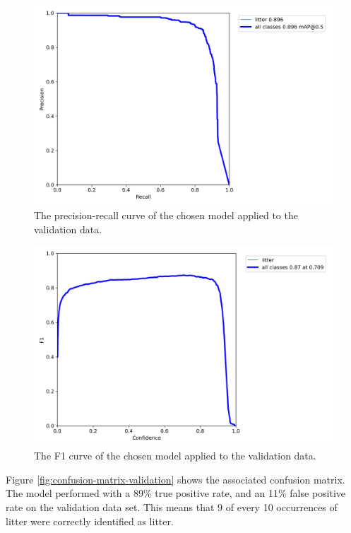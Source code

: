 \documentclass{thesis}
\begin{document}
\begin{figure}[h]
    \centering
    \includegraphics[scale=0.5]{images/pr-curve.png}
    \caption{The precision-recall curve of the chosen model applied to the validation data.}
    \label{fig:pr-curve}
\end{figure}

\begin{figure}[h]
    \centering
    \includegraphics[scale=0.5]{images/f1-curve.png}
    \caption{The F1 curve of the chosen model applied to the validation data.}
    \label{fig:f1-curve}
\end{figure}

Figure \ref{fig:confusion-matrix-validation} shows the associated confusion matrix. The model performed with a 89\% true positive rate, and an 11\% false positive rate on the validation data set. This means that 9 of every 10 occurrences of litter were correctly identified as litter.
\end{document}
